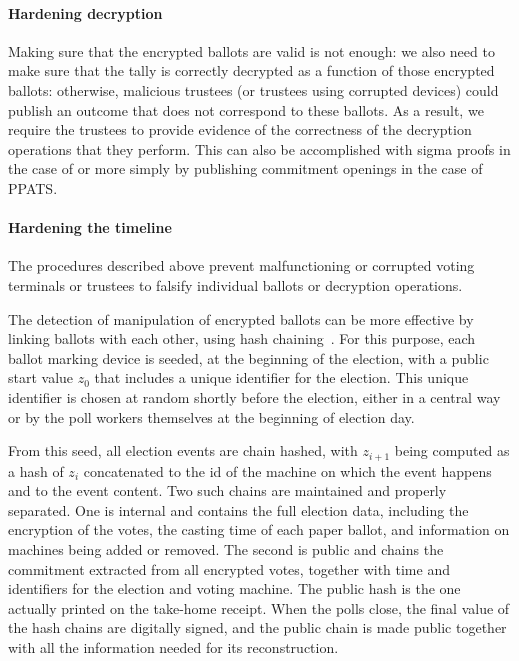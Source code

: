 \paragraph{Hardening decryption}
\label{sec:hardening-decryption}
Making sure that the encrypted ballots are valid is not enough: we
also need to make sure that the tally is correctly decrypted as a
function of those encrypted ballots: otherwise, malicious trustees (or
trustees using corrupted devices) could publish an outcome that does
not correspond to these ballots. As a result, we require the trustees
to provide evidence of the correctness of the decryption operations
that they perform.  This can also be accomplished with sigma
proofs in the case of \elgamal or more simply by publishing commitment
openings in the case of PPATS.

\paragraph{Hardening the timeline}
\label{sec:hard-timeline}

The procedures described above prevent malfunctioning or corrupted
voting terminals or trustees to falsify individual ballots or decryption
operations.

The detection of manipulation of encrypted ballots can be more
effective by linking ballots with each other, using hash
chaining~\cite{sandler07auditorium,BL11}.  For this purpose, each ballot
marking device is seeded, at the beginning of the election, with a
public start value $z_0$ that includes a unique identifier for the
election.  This unique identifier is chosen at random shortly before
the election, either in a central way or by the poll workers
themselves at the beginning of election day.


From this seed, all election events are chain hashed, with $z_{i+1}$
being computed as a hash of $z_i$ concatenated to the id of the
machine on which the event happens and to the event content. Two such
chains are maintained and properly separated. One is internal and
contains the full election data, including the encryption of the
votes, the casting time of each paper ballot, and information on
machines being added or removed.  The second is public and
chains the commitment extracted from all encrypted votes, together
with time and identifiers for the election and voting machine. The
public hash is the one actually printed on the take-home receipt. When
the polls close, the final value of the hash chains are digitally
signed, and the public chain is made public together with all the
information needed for its reconstruction. 

